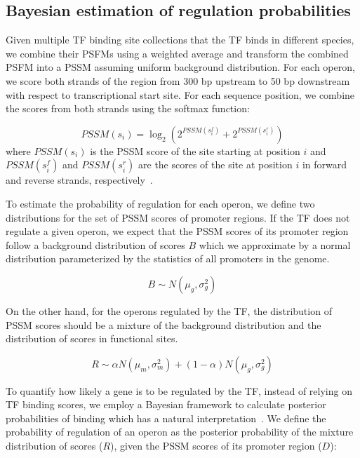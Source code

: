 \documentclass[12pt]{article}
\begin{document}
\subsection{Bayesian estimation of regulation probabilities}

Given multiple TF binding site collections that the TF binds in different
species, we combine their PSFMs using a weighted average and transform the
combined PSFM into a PSSM assuming uniform background distribution. For each
operon, we score both strands of the region from 300 bp upstream to 50 bp
downstream with respect to transcriptional start site. For each sequence
position, we combine the scores from both strands using the softmax function:

\begin{equation}
  PSSM(s_i) = \log_2 (2^{PSSM(s_i^f)} + 2^{PSSM(s_i^r)})
\end{equation}
where $PSSM(s_i )$ is the PSSM score of the site starting at position $i$ and
$PSSM(s_i^f)$ and $PSSM(s_i^r)$ are the scores of the site at position $i$ in
forward and reverse strands, respectively~\cite{hobbs2016bayesian}.

To estimate the probability of regulation for each operon, we define two
distributions for the set of PSSM scores of promoter regions. If the TF does
not regulate a given operon, we expect that the PSSM scores of its promoter
region follow a background distribution of scores $B$ which we approximate by a
normal distribution parameterized by the statistics of all promoters in the
genome.

\begin{equation}
  B \sim N(\mu_g, \sigma_g^2)
\end{equation}

On the other hand, for the operons regulated by the TF, the distribution of
PSSM scores should be a mixture of the background distribution and the
distribution of scores in functional sites.

\begin{equation}
R \sim \alpha N(\mu_m, \sigma_m^2) + (1-\alpha) N(\mu_g, \sigma_g^2)
\end{equation}

To quantify how likely a gene is to be regulated by the TF, instead of relying
on TF binding scores, we employ a Bayesian framework to calculate posterior
probabilities of binding which has a natural
interpretation~\cite{hobbs2016bayesian}. We define the probability of
regulation of an operon as the posterior probability of the mixture
distribution of scores ($R$), given the PSSM scores of its promoter region
($D$):
\end{document}
